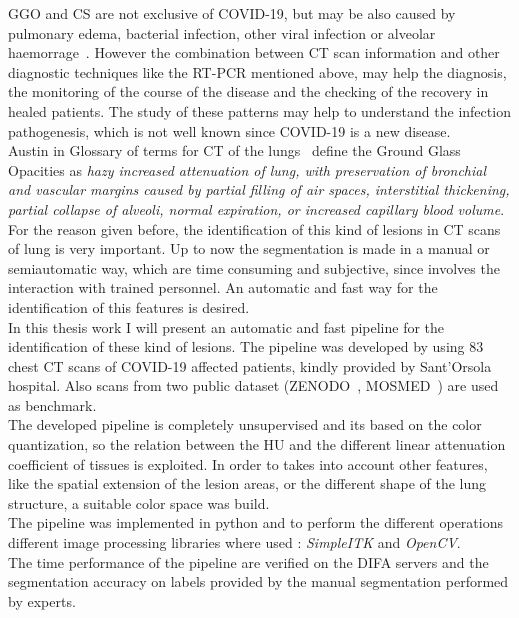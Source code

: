 \documentclass{standalone}
\begin{document}
GGO and CS are not exclusive of COVID-19, but may be also caused by pulmonary edema, bacterial infection, other viral infection or alveolar haemorrage~\cite{ART:Collins}. However the combination between CT scan information and other diagnostic techniques like the RT-PCR mentioned above, may help the diagnosis, the monitoring of the course of the disease and the checking of the recovery in healed patients. The study of these patterns may help to understand the infection pathogenesis, which is not well known since COVID-19 is a new disease.\\
Austin in Glossary of terms for CT of the lungs~\cite{ART:Austin} define the Ground Glass Opacities as \emph{hazy increased attenuation of lung, with preservation of bronchial and vascular margins caused by partial filling of air spaces, interstitial thickening, partial collapse of alveoli, normal expiration, or increased capillary blood volume}.
For the reason given before, the identification of this kind of lesions in CT scans of lung is very important. Up to now the segmentation is made in a manual or semiautomatic way, which are time consuming and subjective, since involves the interaction with trained personnel. An automatic and fast way for the identification of this features is desired.\\
In this thesis work I will present an automatic and fast pipeline for the identification of these kind of lesions. The pipeline was developed by using $83$ chest CT scans of COVID-19 affected patients, kindly provided by Sant'Orsola hospital. Also scans from two public dataset (ZENODO~\cite{DATA:ZENODO}, MOSMED~\cite{DATA:MOSMED}) are used as benchmark.\\
The developed pipeline is completely unsupervised and its based on the color quantization, so the relation between the HU and the different linear attenuation coefficient of tissues is exploited. In order to takes into account other features, like the spatial extension of the lesion areas, or the different shape of the lung structure, a suitable color space was build.\\
The pipeline was implemented in python and to perform the different operations different image processing libraries where used : \emph{SimpleITK} and  \emph{OpenCV}.\\
The time performance of the pipeline are verified on the DIFA servers and the segmentation accuracy on labels provided by the manual segmentation performed by experts.
\end{document}
